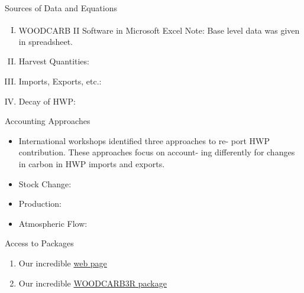 \documentclass[final]{beamer}\usepackage[]{graphicx}\usepackage[]{color}
\begin{document}
\begin{frame}[fragile]
\begin{columns}[t]
\begin{column}{0.23\linewidth}
\begin{minipage}[t][.955\textheight]{\linewidth}
\begin{block}{Sources of Data and Equations}

\begin{enumerate}[I.]
\item WOODCARB II Software in Microsoft Excel\textsuperscript{\textregistered}
\vspace{0ex}
Note: Base level data was given in spreadsheet. 
\item Harvest Quantities:
\item Imports, Exports, etc.:
\item Decay of HWP:
\end{enumerate}
\vspace{0ex}

\end{block}
\vfill


\begin{block}{Accounting Approaches}

\begin{itemize}
\item International workshops identified three approaches to re- port HWP contribution. These approaches focus on account- ing differently for changes in carbon in HWP imports and exports.
\item Stock Change:
\item Production:
\item Atmospheric Flow:
\end{itemize}


\end{block}
\vfill


\begin{block}{Access to Packages}

\begin{enumerate}
\item Our incredible \href{http://madeitup.com}{web page}
\item Our incredible \href{http://benjones2.github.io/WOODCARB3R/}{WOODCARB3R package}
\end{enumerate}


\end{block}
\vfill

\end{minipage}
\end{column}%



\end{columns}
\end{frame}
\end{document}
